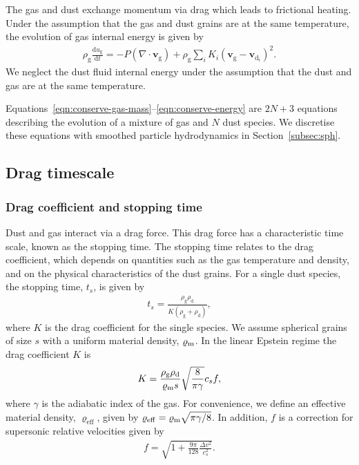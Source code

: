 \documentclass[fleqn,usenatbib]{mnras}
\newcommand{\g}{\mathrm{g}}
\newcommand{\dd}{\mathrm{d}}
\let\vec\bm
\begin{document}
The gas and dust exchange momentum via drag which leads to frictional heating.
Under the assumption that the gas and dust grains are at the same temperature,
the evolution of gas internal energy is given by
%
\begin{align}
   \label{eqn:conserve-energy}
   \rho_{\g} \frac{\dd u_{\g}}{\dd t} =
      - P \left(\nabla \cdot \vec{v}_{\g}\right)
      + \rho_{\g} \sum_i K_i {(\vec{v}_{\g} - \vec{v}_{\dd_i})}^2.
\end{align}
%
We neglect the dust fluid internal energy under the assumption that the dust and
gas are at the same temperature.

Equations~\ref{eqn:conserve-gas-mass}--\ref{eqn:conserve-energy} are \(2N + 3\)
equations describing the evolution of a mixture of gas and \(N\) dust species.
We discretise these equations with smoothed particle hydrodynamics in
Section~\ref{subsec:sph}.

\subsection{Drag timescale}

\subsubsection{Drag coefficient and stopping time}

Dust and gas interact via a drag force. This drag force has a characteristic
time scale, known as the stopping time. The stopping time relates to the drag
coefficient, which depends on quantities such as the gas temperature and
density, and on the physical characteristics of the dust grains. For a single
dust species, the stopping time, \(t_s\), is given by
%
\begin{align}
   \label{eqn:single-stopping-time}
   t_s = \frac{\rho_{\g} \rho_{\dd}}{K (\rho_{\g} + \rho_{\dd})},
\end{align}
%
where \(K\) is the drag coefficient for the single species. We assume spherical
grains of size \(s\) with a uniform material density, \(\varrho_{\rm m}\). In
the linear Epstein regime \citep{Epstein1924PhRv...23..710E} the drag
coefficient \(K\) is
%
\begin{align}
   \label{eqn:single-drag-coefficient}
   K = \frac{\rho_{\g} \rho_{\dd}}{\varrho_{\rm m} s} \sqrt{\frac{8}{\pi\gamma}} c_s f,
\end{align}
%
where \(\gamma\) is the adiabatic index of the gas. For convenience, we define
an effective material density, \(\varrho_{\mathrm{eff}}\), given by
\(\varrho_{\mathrm{eff}} = \varrho_{\rm m} \sqrt{\pi\gamma/8}\). In addition,
\(f\) is a correction for supersonic relative velocities given by
\citep{Kwok1975ApJ...198..583K}
%
\begin{align}
   \label{eqn:supersonic}
   f = \sqrt{1 + \frac{9\pi}{128} \frac{\Delta v^2}{c_s^2}}.
\end{align}
%
\end{document}
